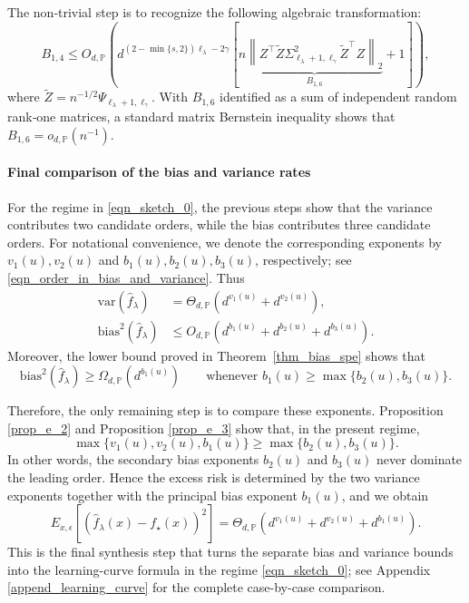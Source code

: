 \documentclass{article}
\theoremstyle{plain}
\theoremstyle{definition}
\theoremstyle{remark}
\begin{document}
\begin{appendix}
The non‑trivial step is to recognize the following algebraic transformation:
$$
B_{1,4} \leq O_{d, \mathbb{P}}\left( d^{(2-\min\{s, 2\})\ell_{\lambda}-2\gamma } \left[ n\underbrace{\left\| Z^{\top} \tilde{Z} \Sigma_{\ell_{\lambda}+1, \ell_{\gamma}}^2 \tilde{Z}^{\top} Z  \right\|_{2}}_{B_{1,6}}+1 \right]\right),
$$
where $\tilde{Z}=n^{-1/2}\Psi_{\ell_{\lambda}+1, \ell_{\gamma}}$. 
With $B_{1, 6}$ identified as a sum of independent random rank‑one matrices, a standard matrix Bernstein inequality shows that $B_{1, 6}=o_{d,\mathbb{P}}(n^{-1})$.
\color{black}

\fi




\paragraph*{Final comparison of the bias and variance rates}

For the regime in \eqref{eqn_sketch_0}, the previous steps show that the variance contributes two candidate orders, while the bias contributes three candidate orders. 
For notational convenience, we denote the corresponding exponents by $v_1(u),v_2(u)$ and $b_1(u),b_2(u),b_3(u)$, respectively; see \eqref{eqn_order_in_bias_and_variance}. 
Thus
\begin{equation*}
    \begin{aligned}
        \mathrm{var}(\hat{f}_{\lambda})
        &= \Theta_{d,\mathbb P}\!\left(d^{v_1(u)}+d^{v_2(u)}\right),\\
        \mathrm{bias}^{2}(\hat{f}_{\lambda})
        &\le O_{d,\mathbb P}\!\left(d^{b_1(u)}+d^{b_2(u)}+d^{b_3(u)}\right).
    \end{aligned}
\end{equation*}
Moreover, the lower bound proved in Theorem~\ref{thm_bias_spe} shows that
\begin{equation*}
    \mathrm{bias}^{2}(\hat{f}_{\lambda})
    \ge \Omega_{d,\mathbb P}\!\left(d^{b_1(u)}\right)
    \qquad\text{whenever } b_1(u)\ge \max\{b_2(u),b_3(u)\}.
\end{equation*}

Therefore, the only remaining step is to compare these exponents. 
Proposition \ref{prop_e_2} and Proposition \ref{prop_e_3} show that, in the present regime,
\begin{equation*}
    \max\{v_1(u),v_2(u),b_1(u)\}\ge \max\{b_2(u),b_3(u)\}.
\end{equation*}
In other words, the secondary bias exponents $b_2(u)$ and $b_3(u)$ never dominate the leading order. 
Hence the excess risk is determined by the two variance exponents together with the principal bias exponent $b_1(u)$, and we obtain
\begin{equation*}
    E_{x,\epsilon}\!\left[\left(\hat f_{\lambda}(x)-f_{\star}(x)\right)^2\right]
    = \Theta_{d,\mathbb P}\!\left(d^{v_1(u)}+d^{v_2(u)}+d^{b_1(u)}\right).
\end{equation*}
This is the final synthesis step that turns the separate bias and variance bounds into the learning-curve formula in the regime \eqref{eqn_sketch_0}; see Appendix \ref{append_learning_curve} for the complete case-by-case comparison.



\end{appendix}
\end{document}
